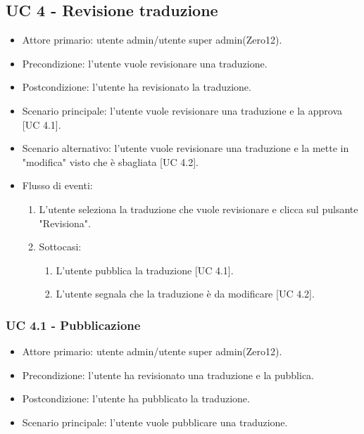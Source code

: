 \subsection{UC 4 - Revisione traduzione}
    \begin{itemize}
        \item Attore primario: utente admin/utente super admin(Zero12).
        \item Precondizione: l'utente vuole revisionare una traduzione.
        \item Postcondizione: l'utente ha revisionato la traduzione.
        \item Scenario principale: l'utente vuole revisionare una traduzione e la approva [UC 4.1].
        \item Scenario alternativo: l'utente vuole revisionare una traduzione e la mette in "modifica" visto che è sbagliata [UC 4.2].
        \item Flusso di eventi:
            \begin{enumerate}
                \item L'utente seleziona la traduzione che vuole revisionare e clicca sul pulsante "Revisiona".
                \item Sottocasi:
                    \begin{enumerate}
                        \item L'utente pubblica la traduzione [UC 4.1].
                        \item L'utente segnala che la traduzione è da modificare [UC 4.2].
                    \end{enumerate}
            \end{enumerate}
    \end{itemize}
    \subsubsection{UC 4.1 - Pubblicazione}
        \begin{itemize}
            \item Attore primario: utente admin/utente super admin(Zero12).
            \item Precondizione: l'utente ha revisionato una traduzione e la pubblica.
            \item Postcondizione: l'utente ha pubblicato la traduzione.
            \item Scenario principale: l'utente vuole pubblicare una traduzione.
        \end{itemize}
